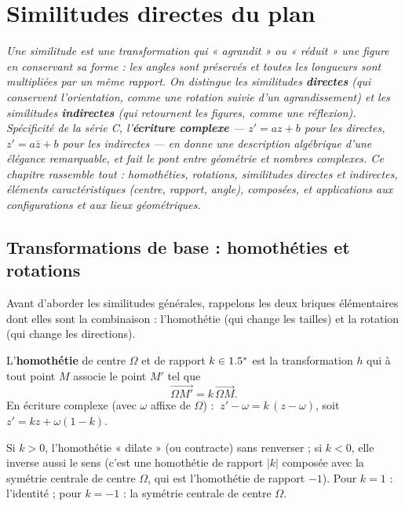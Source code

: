 \chapter{Similitudes directes du plan}

\noindent\textit{Une similitude est une transformation qui « agrandit » ou « réduit » une figure
en conservant sa forme : les angles sont préservés et toutes les longueurs sont multipliées par
un même rapport. On distingue les similitudes \textbf{directes} (qui conservent l'orientation,
comme une rotation suivie d'un agrandissement) et les similitudes \textbf{indirectes} (qui
retournent les figures, comme une réflexion). Spécificité de la série C, l'\textbf{écriture
complexe} — $z'=az+b$ pour les directes, $z'=a\bar z+b$ pour les indirectes — en donne une
description algébrique d'une élégance remarquable, et fait le pont entre géométrie et nombres
complexes. Ce chapitre rassemble tout : homothéties, rotations, similitudes directes et
indirectes, éléments caractéristiques (centre, rapport, angle), composées, et applications aux
configurations et aux lieux géométriques.}
\vspace{8pt}

\section{Transformations de base : homothéties et rotations}

Avant d'aborder les similitudes générales, rappelons les deux briques élémentaires dont elles
sont la combinaison : l'homothétie (qui change les tailles) et la rotation (qui change les
directions).

\begin{definition}[Homothétie]
L'\textbf{homothétie} de centre $\Omega$ et de rapport $k\in1.5^{*}$ est la transformation $h$ qui à
tout point $M$ associe le point $M'$ tel que
\[
\overrightarrow{\Omega M'}=k\,\overrightarrow{\Omega M}.
\]
En écriture complexe (avec $\omega$ affixe de $\Omega$) : $\ z'-\omega=k\,(z-\omega)$, soit $z'=kz+\omega(1-k)$.
\end{definition}

\begin{remarque}
Si $k>0$, l'homothétie « dilate » (ou contracte) sans renverser ; si $k<0$, elle inverse aussi le sens
(c'est une homothétie de rapport $|k|$ composée avec la symétrie centrale de centre $\Omega$, qui est
l'homothétie de rapport $-1$). Pour $k=1$ : l'identité ; pour $k=-1$ : la symétrie centrale de centre $\Omega$.
\end{remarque}

